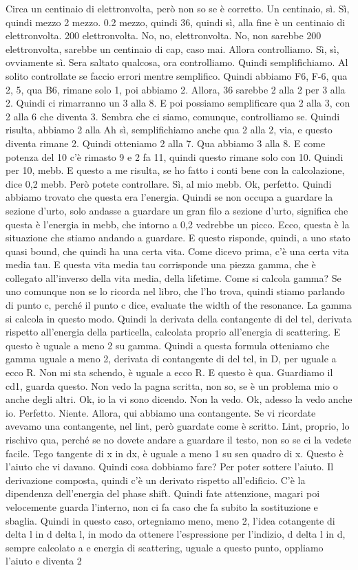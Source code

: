 {\begin{soluzione}
   Circa un centinaio di elettronvolta, però non so se è corretto. Un centinaio, sì. Sì, quindi mezzo 2 mezzo. 0.2 mezzo, quindi 36, quindi sì, alla fine è un centinaio di elettronvolta. 200 elettronvolta. No, no, elettronvolta. No, non sarebbe 200 elettronvolta, sarebbe un centinaio di cap, caso mai. Allora controlliamo. Sì, sì, ovviamente sì. Sera saltato qualcosa, ora controlliamo. Quindi semplifichiamo. Al solito controllate se faccio errori mentre semplifico. Quindi abbiamo F6, F-6, qua 2, 5, qua B6, rimane solo 1, poi abbiamo 2. Allora, 36 sarebbe 2 alla 2 per 3 alla 2. Quindi ci rimarranno un 3 alla 8. E poi possiamo semplificare qua 2 alla 3, con 2 alla 6 che diventa 3. Sembra che ci siamo, comunque, controlliamo se. Quindi risulta, abbiamo 2 alla Ah sì, semplifichiamo anche qua 2 alla 2, via, e questo diventa rimane 2. Quindi otteniamo 2 alla 7. Qua abbiamo 3 alla 8. E come potenza del 10 c'è rimasto 9 e 2 fa 11, quindi questo rimane solo con 10. Quindi per 10, mebb. E questo a me risulta, se ho fatto i conti bene con la calcolazione, dice 0,2 mebb. Però potete controllare. Sì, al mio mebb. Ok, perfetto. Quindi abbiamo trovato che questa era l'energia. Quindi se non occupa a guardare la sezione d'urto, solo andasse a guardare un gran filo a sezione d'urto, significa che questa è l'energia in mebb, che intorno a 0,2 vedrebbe un picco. Ecco, questa è la situazione che stiamo andando a guardare. E questo risponde, quindi, a uno stato quasi bound, che quindi ha una certa vita. Come dicevo prima, c'è una certa vita media tau. E questa vita media tau corrisponde una piezza gamma, che è collegato all'inverso della vita media, della lifetime. Come si calcola gamma? Se uno comunque non se lo ricorda nel libro, che l'ho trova, quindi stiamo parlando di punto c, perché il punto c dice, evaluate the width of the resonance. La gamma si calcola in questo modo. Quindi la derivata della contangente di del tel, derivata rispetto all'energia della particella, calcolata proprio all'energia di scattering. E questo è uguale a meno 2 su gamma. Quindi a questa formula otteniamo che gamma uguale a meno 2, derivata di contangente di del tel, in D, per uguale a ecco R. Non mi sta schendo, è uguale a ecco R. E questo è qua. Guardiamo il cd1, guarda questo. Non vedo la pagna scritta, non so, se è un problema mio o anche degli altri. Ok, io la vi sono dicendo. Non la vedo. Ok, adesso la vedo anche io. Perfetto. Niente. Allora, qui abbiamo una contangente. Se vi ricordate avevamo una contangente, nel lint, però guardate come è scritto. Lint, proprio, lo rischivo qua, perché se no dovete andare a guardare il testo, non so se ci la vedete facile. Tego tangente di x in dx, è uguale a meno 1 su sen quadro di x. Questo è l'aiuto che vi davano. Quindi cosa dobbiamo fare? Per poter sottere l'aiuto. Il derivazione composta, quindi c'è un derivato rispetto all'edificio. C'è la dipendenza dell'energia del phase shift. Quindi fate attenzione, magari poi velocemente guarda l'interno, non ci fa caso che fa subito la sostituzione e sbaglia. Quindi in questo caso, ortegniamo meno, meno 2, l'idea cotangente di delta l in d delta l, in modo da ottenere l'espressione per l'indizio, d delta l in d, sempre calcolato a e energia di scattering, uguale a questo punto, oppliamo l'aiuto e diventa 2 
\end{soluzione}}
